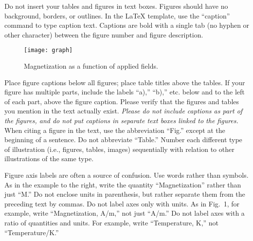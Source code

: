 \documentclass[conf]{new-aiaa}
\begin{document}
Do not insert your tables and figures in text boxes. Figures should have no background, borders, or outlines. In the \LaTeX{} template, use the ``caption'' command to type caption text. Captions are bold with a single tab (no hyphen or other character) between the figure number and figure description.



\begin{figure}[hbt!]
\centering
\texttt{[image: graph]}
\caption{Magnetization as a function of applied fields.}
\end{figure}

Place figure captions below all figures; place table titles above the tables. If your figure has multiple parts, include the labels ``a),'' ``b),'' etc. below and to the left of each part, above the figure caption. Please verify that the figures and tables you mention in the text actually exist. \emph{Please do not include captions as part of the figures, and do not put captions in separate text boxes linked to the figures.} When citing a figure in the text, use the abbreviation ``Fig.'' except at the beginning of a sentence. Do not abbreviate ``Table.'' Number each different type of illustration (i.e., figures, tables, images) sequentially with relation to other illustrations of the same type.

Figure axis labels are often a source of confusion. Use words rather than symbols. As in the example to the right, write the quantity ``Magnetization'' rather than just ``M.'' Do not enclose units in parenthesis, but rather separate them from the preceding text by commas. Do not label axes only with units. As in Fig.~1, for example, write ``Magnetization, \si[per-mode=symbol]{\ampere\per\meter},'' not just ``A/m.'' Do not label axes with a ratio of quantities and units. For example, write ``Temperature, K,'' not ``Temperature/K.''
\end{document}
